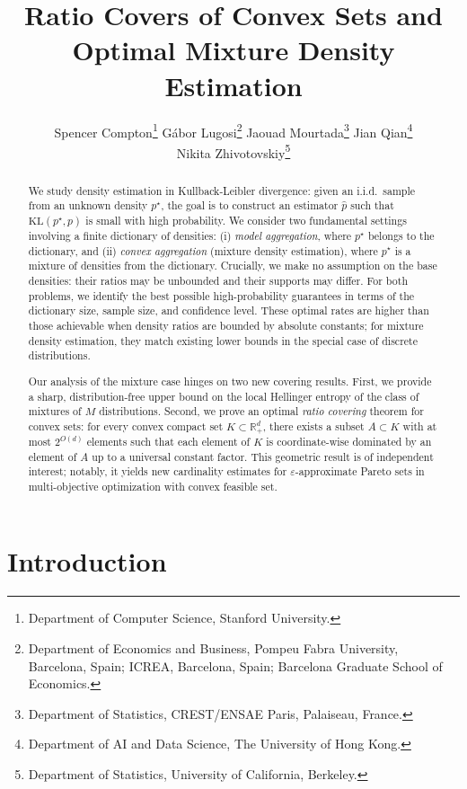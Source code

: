 \documentclass[11pt]{article}
\title{Ratio Covers of Convex Sets and Optimal Mixture Density Estimation}
\author{
Spencer Compton\thanks{Department of Computer Science, Stanford University.}\quad
G\'{a}bor Lugosi\thanks{Department of Economics and Business, Pompeu Fabra University, Barcelona, Spain; ICREA, Barcelona, Spain; Barcelona Graduate School of Economics.}\quad
Jaouad Mourtada\thanks{Department of Statistics, CREST/ENSAE Paris, Palaiseau, France.}\quad
Jian Qian\thanks{Department of AI and Data Science, The University of Hong Kong.}\\
Nikita Zhivotovskiy\thanks{Department of Statistics, University of California, Berkeley.}
}
\date{}
\newcommand{\M}{M}
\theoremstyle{definition}
\theoremstyle{remark}
\begin{document}
\maketitle

\begin{abstract}
  We study density estimation in Kullback-Leibler divergence: given an i.i.d.~sample from an unknown density $p^\star$, the goal is to construct an estimator $\widehat{p}$ such that $\mathrm{KL} (p^\star, \widehat{p})$ is small with high probability.
  We consider two fundamental settings involving a finite dictionary of densities: (i) \emph{model aggregation}, where $p^\star$ belongs to the dictionary, and (ii) \emph{convex aggregation} (mixture density estimation), where $p^\star$ is a mixture of densities from the dictionary.
  Crucially, we make no assumption on the base densities: their ratios may be unbounded and their supports may differ.
  For both problems, we identify the best possible high-probability guarantees in terms of the dictionary size, sample size, and confidence level.
  These optimal rates are higher than those achievable when density ratios are bounded by absolute constants; for mixture density estimation, they match existing lower bounds in the special case of discrete distributions.
  
  Our analysis of the mixture case hinges on two new covering results.
  First, we provide a sharp, distribution-free upper bound on the local Hellinger entropy of the class of mixtures of $\M$ distributions.
  Second, we prove an optimal \emph{ratio covering} theorem for convex sets: for every convex compact set $K \subset \mathbb{R}_+^d$, there exists a subset $A \subset K$ with at most $2^{O(d)}$ elements such that each element of $K$ is coordinate-wise dominated by an element of $A$ up to a universal constant factor.
  This geometric result is of independent interest; notably, it yields new cardinality estimates for $\varepsilon$-approximate Pareto sets in multi-objective optimization with convex feasible set.
\end{abstract}

\setcounter{tocdepth}{1}
\section{Introduction}
\end{document}
